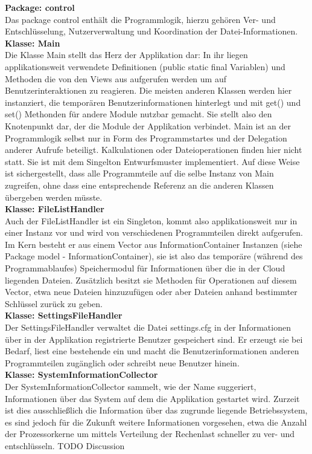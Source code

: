 \documentclass[12pt,a4paper,bibliography=totocnumbered,listof=totocnumbered]{scrartcl}
\begin{document}
\textbf{Package: control}\\
Das package control enthält die Programmlogik, hierzu gehören Ver- und Entschlüsselung, Nutzerverwaltung und Koordination der Datei-Informationen.\\
\textbf{Klasse: Main}\\
Die Klasse Main stellt das Herz der Applikation dar: In ihr liegen applikationsweit verwendete Definitionen (public static final Variablen) und Methoden die von den Views aus aufgerufen werden um auf Benutzerinteraktionen zu reagieren. Die meisten anderen Klassen werden hier instanziert, die temporären Benutzerinformationen hinterlegt und mit get() und set() Methonden für andere Module nutzbar gemacht. Sie stellt also den Knotenpunkt dar, der die Module der Applikation verbindet. Main ist an der Programmlogik selbst nur in Form des Programmstartes und der Delegation anderer Aufrufe beteiligt. Kalkulationen oder Dateioperationen finden hier nicht statt. Sie ist mit dem Singelton Entwurfsmuster implementiert. Auf diese Weise ist sichergestellt, dass alle Programmteile auf die selbe Instanz von Main zugreifen, ohne dass eine entsprechende Referenz an die anderen Klassen übergeben werden müsste.\\
\textbf{Klasse: FileListHandler}\\
Auch der FileListHandler ist ein Singleton, kommt also applikationsweit nur in einer Instanz vor und wird von verschiedenen Programmteilen direkt aufgerufen. Im Kern besteht er aus einem Vector aus InformationContainer Instanzen (siehe Package model - InformationContainer), sie ist also das temporäre (während des Programmablaufes) Speichermodul für Informationen über die in der Cloud liegenden Dateien. Zusätzlich besitzt sie Methoden für Operationen auf diesem Vector, etwa neue Dateien hinzuzufügen oder aber Dateien anhand bestimmter Schlüssel zurück zu geben.\\
\textbf{Klasse: SettingsFileHandler}\\
Der SettingsFileHandler verwaltet die Datei settings.cfg in der Informationen über in der Applikation registrierte Benutzer gespeichert sind. Er erzeugt sie bei Bedarf, liest eine bestehende ein und macht die Benutzerinformationen anderen Programmteilen zugänglich oder schreibt neue Benutzer hinein.\\
\textbf{Klasse: SystemInformationCollector}\\
Der SystemInformationCollector sammelt, wie der Name suggeriert, Informationen über das System auf dem die Applikation gestartet wird. Zurzeit ist dies ausschließlich die Information über das zugrunde liegende Betriebssystem, es sind jedoch für die Zukunft weitere Informationen vorgesehen, etwa die Anzahl der Prozessorkerne um mittels Verteilung der Rechenlast schneller zu ver- und entschlüsseln. TODO Discussion\\
\end{document}
